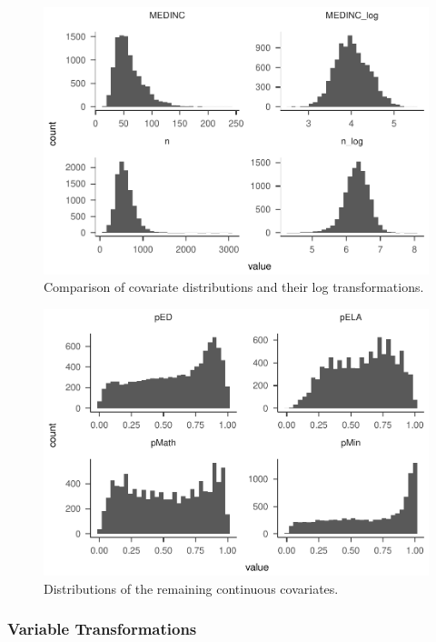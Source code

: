 \documentclass[man]{apa6}
\theoremstyle{definition}
\theoremstyle{definition}
\theoremstyle{definition}
\theoremstyle{remark}
\begin{document}
\begin{figure}
\centering
\includegraphics{Method_files/figure-latex/dists-1.pdf}
\caption{\label{fig:dists}Comparison of covariate distributions and their
log transformations.}
\end{figure}

\begin{figure}
\centering
\includegraphics{Method_files/figure-latex/dists2-1.pdf}
\caption{\label{fig:dists2}Distributions of the remaining continuous
covariates.}
\end{figure}

\subsubsection{Variable Transformations}\label{variable-transformations}
\end{document}
